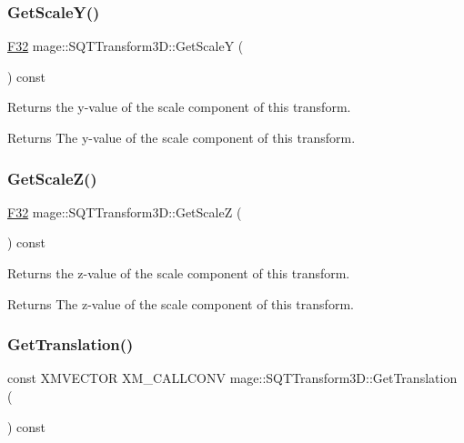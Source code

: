\subsubsection{\texorpdfstring{Get\+Scale\+Y()}{GetScaleY()}}
{\footnotesize\ttfamily \mbox{\hyperlink{namespacemage_aa97e833b45f06d60a0a9c4fc22ae02c0}{F32}} mage\+::\+S\+Q\+T\+Transform3\+D\+::\+Get\+ScaleY (\begin{DoxyParamCaption}{ }\end{DoxyParamCaption}) const\hspace{0.3cm}{\ttfamily [noexcept]}}

Returns the y-\/value of the scale component of this transform.

\begin{DoxyReturn}{Returns}
The y-\/value of the scale component of this transform. 
\end{DoxyReturn}
\mbox{\label{classmage_1_1_s_q_t_transform3_d_a1466fc2eb41783e6693bfe5c3545c06e}} 
\subsubsection{\texorpdfstring{Get\+Scale\+Z()}{GetScaleZ()}}
{\footnotesize\ttfamily \mbox{\hyperlink{namespacemage_aa97e833b45f06d60a0a9c4fc22ae02c0}{F32}} mage\+::\+S\+Q\+T\+Transform3\+D\+::\+Get\+ScaleZ (\begin{DoxyParamCaption}{ }\end{DoxyParamCaption}) const\hspace{0.3cm}{\ttfamily [noexcept]}}

Returns the z-\/value of the scale component of this transform.

\begin{DoxyReturn}{Returns}
The z-\/value of the scale component of this transform. 
\end{DoxyReturn}
\mbox{\label{classmage_1_1_s_q_t_transform3_d_a6dd391ac824e4986740021893af96ba3}} 
\subsubsection{\texorpdfstring{Get\+Translation()}{GetTranslation()}}
{\footnotesize\ttfamily const X\+M\+V\+E\+C\+T\+OR X\+M\+\_\+\+C\+A\+L\+L\+C\+O\+NV mage\+::\+S\+Q\+T\+Transform3\+D\+::\+Get\+Translation (\begin{DoxyParamCaption}{ }\end{DoxyParamCaption}) const\hspace{0.3cm}{\ttfamily [noexcept]}}

